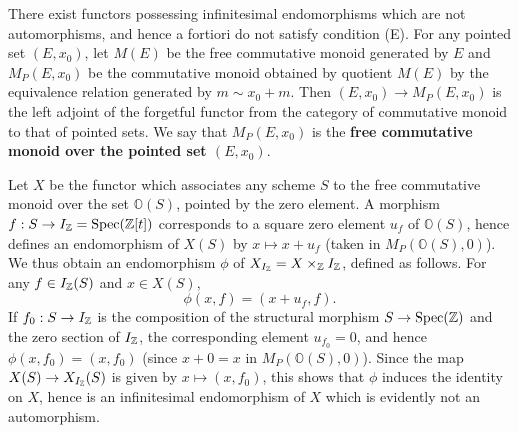 \begin{example}\label{scheme functor condition (E) non-example}
There exist functors possessing infinitesimal endomorphisms which are not automorphisms, and hence a fortiori do not satisfy condition (E). For any pointed set $(E,x_0)$, let $M(E)$ be the free commutative monoid generated by $E$ and $M_P(E,x_0)$ be the commutative monoid obtained by quotient $M(E)$ by the equivalence relation generated by $m\sim x_0+m$. Then $(E,x_0)\to M_P(E,x_0)$ is the left adjoint of the forgetful functor from the category of commutative monoid to that of pointed sets. We say that $M_P(E,x_0)$ is the \textbf{free commutative monoid over the pointed set $(E,x_0)$}.\par
Let $X$ be the functor which associates any scheme $S$ to the free commutative monoid over the set $\mathbb{O}(S)$, pointed by the zero element. A morphism $f:S\to I_{\mathbb{Z}}=\mathrm{Spec}(\mathbb{Z}[t])$ corresponds to a square zero element $u_f$ of $\mathbb{O}(S)$, hence defines an endomorphism of $X(S)$ by $x\mapsto x+u_f$ (taken in $M_P(\mathbb{O}(S),0)$). We thus obtain an endomorphism $\phi$ of $X_{I_{\mathbb{Z}}}=X\times_{\mathbb{Z}}I_{\mathbb{Z}}$, defined as follows. For any $f\in I_{\mathbb{Z}}(S)$ and $x\in X(S)$,
\[\phi(x,f)=(x+u_f,f).\]
If $f_0:S\to I_{\mathbb{Z}}$ is the composition of the structural morphism $S\to\mathrm{Spec}(\mathbb{Z})$ and the zero section of $I_{\mathbb{Z}}$, the corresponding element $u_{f_0}=0$, and hence $\phi(x,f_0)=(x,f_0)$ (since $x+0=x$ in $M_P(\mathbb{O}(S),0)$). Since the map $X(S)\to X_{I_{\mathbb{Z}}}(S)$ is given by $x\mapsto (x,f_0)$, this shows that $\phi$ induces the identity on $X$, hence is an infinitesimal endomorphism of $X$ which is evidently not an automorphism.
\end{example}

